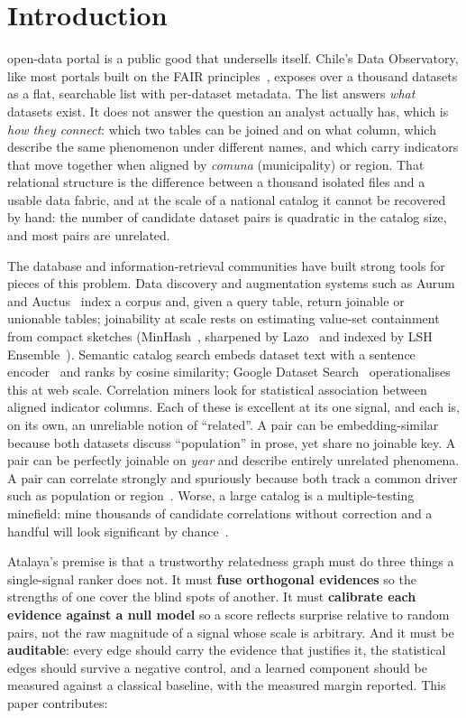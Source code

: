 \documentclass[journal]{IEEEtran}
\newcommand{\dsname}[1]{\textit{#1}}
\begin{document}
\section{Introduction}

 open-data portal is a public good that undersells itself. Chile's Data Observatory,
like most portals built on the FAIR principles~\cite{fair}, exposes over a thousand datasets as a flat,
searchable list with per-dataset metadata. The list answers \emph{what} datasets exist. It does not answer the
question an analyst actually has, which is \emph{how they connect}: which two tables can be joined and on what
column, which describe the same phenomenon under different names, and which carry indicators that move
together when aligned by \dsname{comuna} (municipality) or region. That relational structure is the difference
between a thousand isolated files and a usable data fabric, and at the scale of a national catalog it cannot be
recovered by hand: the number of candidate dataset pairs is quadratic in the catalog size, and most pairs are
unrelated.

The database and information-retrieval communities have built strong tools for pieces of this problem. Data
discovery and augmentation systems such as Aurum~\cite{aurum} and Auctus~\cite{auctus} index a corpus and, given
a query table, return joinable or unionable tables; joinability at scale rests on estimating value-set
containment from compact sketches (MinHash~\cite{minhash}, sharpened by Lazo~\cite{lazo} and indexed by LSH
Ensemble~\cite{lshensemble}). Semantic catalog search embeds dataset text with a sentence
encoder~\cite{sbert,minilm} and ranks by cosine similarity; Google Dataset Search~\cite{gds} operationalises
this at web scale. Correlation miners look for statistical association between aligned indicator columns. Each of
these is excellent at its one signal, and each is, on its own, an unreliable notion of ``related''. A pair can be
embedding-similar because both datasets discuss ``population'' in prose, yet share no joinable key. A pair can be
perfectly joinable on \dsname{year} and describe entirely unrelated phenomena. A pair can correlate strongly and
spuriously because both track a common driver such as population or region~\cite{partialcorr}. Worse, a large
catalog is a multiple-testing minefield: mine thousands of candidate correlations without correction and a
handful will look significant by chance~\cite{bh}.

Atalaya's premise is that a trustworthy relatedness graph must do three things a single-signal ranker does not.
It must \textbf{fuse orthogonal evidences} so the strengths of one cover the blind spots of another. It must
\textbf{calibrate each evidence against a null model} so a score reflects surprise relative to random pairs, not
the raw magnitude of a signal whose scale is arbitrary. And it must be \textbf{auditable}: every edge
should carry the evidence that justifies it, the statistical edges should survive a negative control, and a
learned component should be measured against a classical baseline, with the measured margin reported.
This paper contributes:
\end{document}

